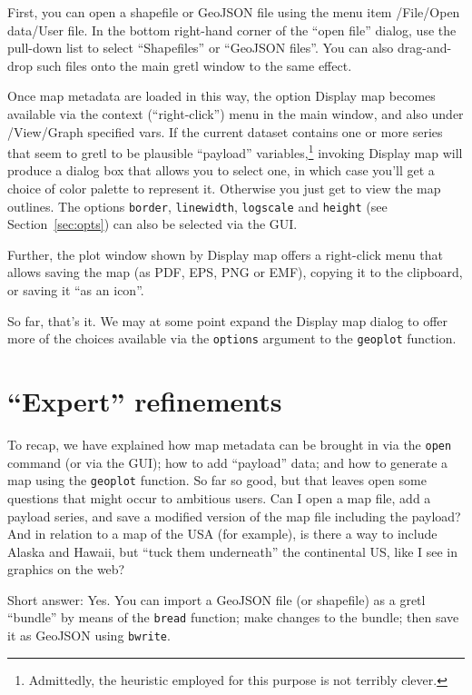 \documentclass{article}
\begin{document}
First, you can open a shapefile or GeoJSON file using the menu item
\textsf{/File/Open data/User file}. In the bottom right-hand corner of
the ``open file'' dialog, use the pull-down list to select
``Shapefiles'' or ``GeoJSON files''. You can also drag-and-drop such
files onto the main gretl window to the same effect.

Once map metadata are loaded in this way, the option \textsf{Display
  map} becomes available via the context (``right-click'') menu in the
main window, and also under \textsf{/View/Graph specified vars}. If
the current dataset contains one or more series that seem to gretl to
be plausible ``payload'' variables,\footnote{Admittedly, the heuristic
  employed for this purpose is not terribly clever.} invoking
\textsf{Display map} will produce a dialog box that allows you to
select one, in which case you'll get a choice of color palette to
represent it. Otherwise you just get to view the map outlines.  The
options \texttt{border}, \texttt{linewidth}, \texttt{logscale} and
\texttt{height} (see Section~\ref{sec:opts}) can also be selected via
the GUI.

Further, the plot window shown by \textsf{Display map} offers a
right-click menu that allows saving the map (as PDF, EPS, PNG or EMF),
copying it to the clipboard, or saving it ``as an icon''.

So far, that's it. We may at some point expand the \textsf{Display
  map} dialog to offer more of the choices available via the
\texttt{options} argument to the \texttt{geoplot}
function.

\section{``Expert'' refinements}
\label{sec:expert}

To recap, we have explained how map metadata can be brought in via the
\texttt{open} command (or via the GUI); how to add ``payload'' data;
and how to generate a map using the \texttt{geoplot} function. So far
so good, but that leaves open some questions that might occur to
ambitious users.  Can I open a map file, add a payload series, and
save a modified version of the map file including the payload? And in
relation to a map of the USA (for example), is there a way to include
Alaska and Hawaii, but ``tuck them underneath'' the continental US,
like I see in graphics on the web?

Short answer: Yes. You can import a GeoJSON file (or shapefile) as a
gretl ``bundle'' by means of the \texttt{bread} function; make changes
to the bundle; then save it as GeoJSON using \texttt{bwrite}.
\end{document}
